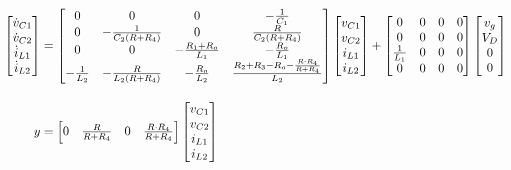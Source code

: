 \begin{align*}
\begin{bmatrix}
\dispdot{v_{C1}} \\ \dispdot{v_{C2}} \\ \dispdot{i_{L1}} \\ \dispdot{i_{L2}}
\end{bmatrix}
&=
\begin{bmatrix}
0 & 0 & 0 & \minus\frac{1}{C_1}\\
0 & \minus\frac{1}{C_2(R + R_4)} & 0 & \frac{R}{C_2(R + R_4)}\\
0 & 0 & \minus\frac{R_1 + R_o}{L_1} & \minus\frac{R_o}{L_1}\\
\minus\frac{1}{L_2} & \minus\frac{R}{L_2(R + R_4)} & \minus\frac{R_o}{L_2} & \frac{R_2 + R_3 - R_o - \frac{R \cdot R_4}{R + R_4}}{L_2}
\end{bmatrix}
\begin{bmatrix}
v_{C1} \\ v_{C2} \\ i_{L1} \\ i_{L2}
\end{bmatrix}
+
\begin{bmatrix}
0 & 0 & 0 & 0\\
0 & 0 & 0 & 0\\
\frac{1}{L_1} & 0 & 0 & 0\\
0 & 0 & 0 & 0
\end{bmatrix}
\begin{bmatrix}
v_g \\ V_D \\ 0 \\ 0
\end{bmatrix}
\\[11pt]
y &=
\begin{bmatrix}
0 & \frac{R}{R + R_4} & 0 & \frac{R \cdot R_4}{R + R_4}
\end{bmatrix}
\begin{bmatrix}
v_{C1} \\ v_{C2} \\ i_{L1} \\ i_{L2}
\end{bmatrix}
\end{align*}
